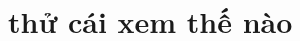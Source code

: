 \documentclass[../DoAn.tex]{subfiles}
\begin{document}
\section{thử cái xem thế nào }
\end{document}
